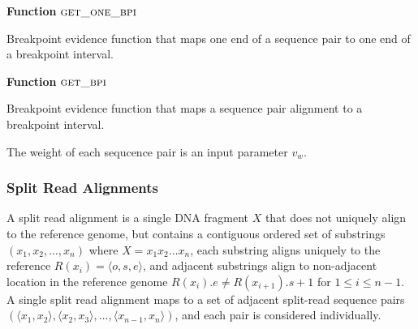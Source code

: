\documentclass[11pt]{article}
\begin{document}
\begin{algorithm}[H]
    \DontPrintSemicolon
    \footnotesize
    \BlankLine
    \textbf{Function} $\textsc{get\_one\_bpi}$\;
	\caption{Breakpoint evidence function that maps one end of a sequence pair
			to one end of a breakpoint interval.}
    \label{get_one_bpi}
\end{algorithm}

\begin{algorithm}[H]
    \DontPrintSemicolon
    \footnotesize
    \BlankLine
    \textbf{Function} $\textsc{get\_bpi}$\;
	\caption{Breakpoint evidence function that maps a sequence pair alignment to
			a breakpoint interval.}
    \label{get_bp}
\end{algorithm}


The weight of each sequcence pair is an input parameter $v_w$.

\subsubsection{Split Read Alignments}

A split read alignment is a single DNA fragment $X$ that does not uniquely align
to the reference genome, but contains a contiguous ordered set of substrings
$(x_1, x_2, \dots, x_n)$ where $X=x_1x_2\dots x_n$, each substring aligns
uniquely to the reference $R(x_i)=\langle o,s,e \rangle$, and adjacent
substrings align to non-adjacent location in the reference genome
$R(x_{i}).e \neq R(x_{i+1}).s + 1$ for $1\leq i \leq n-1$. A single split read
alignment maps to a set of adjacent split-read sequence pairs 
$(\langle x_1 , x_2 \rangle, \langle x_2, x_3 \rangle, \dots ,
\langle x_{n-1},x_n \rangle)$, and each pair is considered individually.
\end{document}
